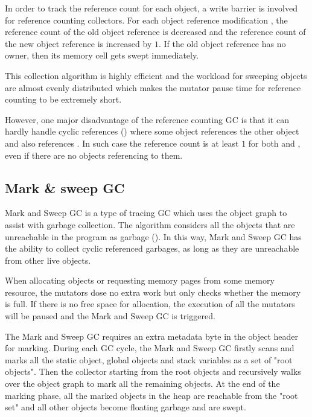 In order to track the reference count for each object, a write barrier is involved
for reference counting collectors.
For each object reference modification , the reference count of
the old object reference is decreased and the reference count of the new object reference
is increased by $1$. If the old object reference has no owner, then its memory cell gets swept immediately.

This collection algorithm is highly efficient and the workload for sweeping objects are
almost evenly distributed which makes the mutator pause time for reference counting
to be extremely short.

However, one major disadvantage of the reference counting GC is that it can hardly
handle cyclic references (\cite{lins1992cyclic}) where some object  references the other object
 and  also references . In such case the reference
count is at least $1$ for both  and , even if there are no
objects referencing to them.

\subsection{Mark \& sweep GC}

Mark and Sweep GC is a type of tracing GC which uses the object graph to assist with garbage collection.
The algorithm considers all the objects that are unreachable in the program as garbage (\cite{endo1997scalable}).
In this way, Mark and Sweep GC has the ability to collect cyclic referenced garbages,
as long as they are unreachable from other live objects.


When allocating objects or requesting memory pages from some memory resource,
the mutators dose no extra work but only checks whether the memory is full.
If there is no free space for allocation, the execution of all the mutators will be
paused and the Mark and Sweep GC is triggered.

The Mark and Sweep GC requires an extra metadata byte in the object header for marking.
During each GC cycle, the Mark and Sweep GC firstly scans and marks all the static object,
global objects and stack variables as a set of "root objects".
Then the collector starting from the root objects and recursively walks over the
object graph to mark all the remaining objects. At the end of the marking phase,
all the marked objects in the heap are reachable from the "root set" and all other
objects become floating garbage and are swept.

